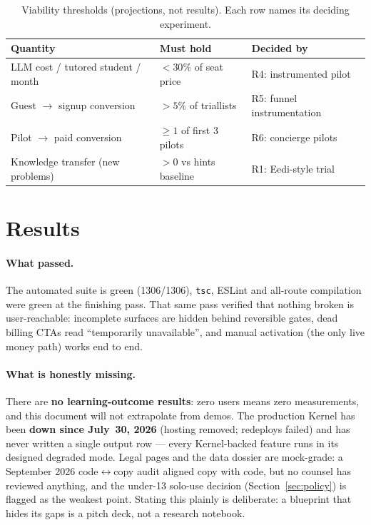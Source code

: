 \documentclass[11pt,a4paper]{article}
\let\oldsection\section
\renewcommand{\section}{\clearpage\oldsection}
\newcommand{\vitestcount}{1306}
\begin{document}
\begin{table}[h]
\centering
\caption{Viability thresholds (projections, not results). Each row names its
deciding experiment.}
\label{tab:thresholds}
\begin{tabular}{@{}lll@{}}
\toprule
Quantity & Must hold & Decided by \\
\midrule
LLM cost / tutored student / month & $< 30\%$ of seat price & R4: instrumented pilot \\
Guest $\to$ signup conversion & $> 5\%$ of triallists & R5: funnel instrumentation \\
Pilot $\to$ paid conversion & $\geq 1$ of first 3 pilots & R6: concierge pilots \\
Knowledge transfer (new problems) & $> 0$ vs hints baseline & R1: Eedi-style trial \\
\bottomrule
\end{tabular}
\end{table}

\section{Results}
\label{sec:results}

\paragraph{What passed.} The automated suite is green (\vitestcount{}/\vitestcount{}),
\texttt{tsc}, ESLint and all-route compilation were green at the
finishing pass. That same pass verified that nothing broken is user-reachable: incomplete
surfaces are hidden behind reversible gates, dead billing CTAs read
``temporarily unavailable'', and manual activation (the only live money path)
works end to end.

\paragraph{What is honestly missing.} There are \textbf{no learning-outcome
results}: zero users means zero measurements, and this document will not
extrapolate from demos. The production Kernel has been \textbf{down since
July~30, 2026} (hosting removed; redeploys failed) and has never written a
single output row --- every Kernel-backed feature runs in its designed
degraded mode. Legal pages and the data dossier are mock-grade: a September 2026
code$\leftrightarrow$copy audit aligned copy with code, but no counsel has
reviewed anything, and the under-13 solo-use decision (Section~\ref{sec:policy})
is flagged as the weakest point. Stating this plainly is deliberate: a
blueprint that hides its gaps is a pitch deck, not a research notebook.
\end{document}
